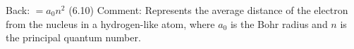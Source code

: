 \documentclass{article}
\begin{document}
\pagecolor{white} %
\centering
 Back: \( = a_0 n^2 \) (6.10)  Comment: Represents the average distance of the electron from the nucleus in a hydrogen-like atom, where \( a_0 \) is the Bohr radius and \( n \) is the principal quantum number.
\end{document}

